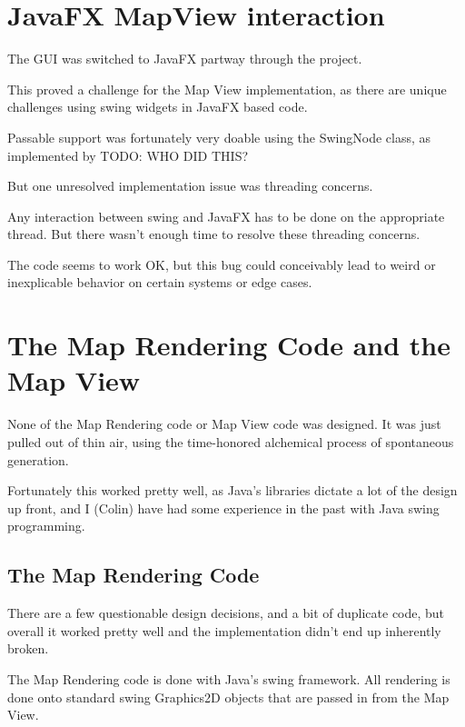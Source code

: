 \documentclass[12pt,a4paper]{article}
\begin{document}
\section{JavaFX MapView interaction}
The GUI was switched to JavaFX partway through the project.

This proved a challenge for the Map View implementation, as there are unique
challenges using swing widgets in JavaFX based code.

Passable support was fortunately very doable using the SwingNode class,
as implemented by TODO: WHO DID THIS?

But one unresolved implementation issue was threading concerns.

Any interaction between swing and JavaFX has to be done on the appropriate
thread. But there wasn't enough time to resolve these threading concerns.

The code seems to work OK, but this bug could conceivably lead to weird
or inexplicable behavior on certain systems or edge cases.

\section{The Map Rendering Code and the Map View}

None of the Map Rendering code or Map View code was designed.
It was just pulled out of thin air, using the time-honored alchemical process
of spontaneous generation.

Fortunately this worked pretty well, as Java's libraries dictate a lot
of the design up front, and I (Colin) have had some experience in the past
with Java swing programming.

\subsection{The Map Rendering Code}
There are a few questionable design decisions, and a bit of duplicate code,
but overall it worked pretty well and the implementation didn't end up
inherently broken.

The Map Rendering code is done with Java's swing framework. All rendering
is done onto standard swing Graphics2D objects that are passed in from the
Map View.
\end{document}
